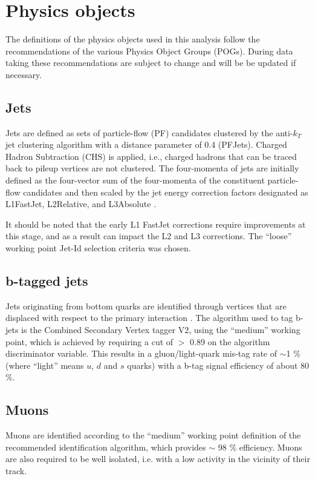 \section{Physics objects}
\label{sec:objects}
The definitions of the physics objects used in this analysis follow the recommendations of the various Physics Object Groups (POGs). 
During data taking these recommendations are subject to change and will be be updated if necessary.

\subsection{Jets}
\label{sec:jetreco}
Jets are defined as sets of particle-flow (PF) candidates clustered by the
anti-$k_{T}$ jet clustering algorithm \cite{Cacciari:2008gp} with a distance parameter of 0.4
(PFJets). Charged Hadron Subtraction (CHS) is applied, i.e., charged
hadrons that can be traced back to pileup vertices are not clustered.
The four-momenta of jets are initially defined as the four-vector sum of
the four-momenta of the constituent particle-flow candidates and then
scaled by the jet energy correction factors designated as L1FastJet,
L2Relative, and L3Absolute \cite{Chatrchyan:2011ds}.

It should be noted that the early L1 FastJet corrections require
improvements at this stage, and as a result can impact the L2 and L3
corrections. The ``loose'' working point Jet-Id selection criteria was
chosen.

\subsection{b-tagged jets}
\label{sec:btags}
Jets originating from bottom quarks are identified through vertices that are displaced with respect to the primary interaction \cite{Chatrchyan:2012jua}. The algorithm used to tag b-jets is the Combined Secondary Vertex tagger V2, using the ``medium'' working point, which is achieved by requiring a cut of $>$ 0.89 on the algorithm discriminator variable. 
This results in a gluon/light-quark mis-tag rate of $\sim$1 \% (where ``light'' means $u$, $d$ and $s$ quarks) with a b-tag signal efficiency of about 80 \%. 


\subsection{Muons}
\label{sec:muon-id}
Muons are identified according to the ``medium'' working point definition of the recommended identification algorithm, which provides $\sim$ 98 $\%$ efficiency. 
Muons are also required to be well isolated, i.e. with a low activity in the vicinity of their track. 

